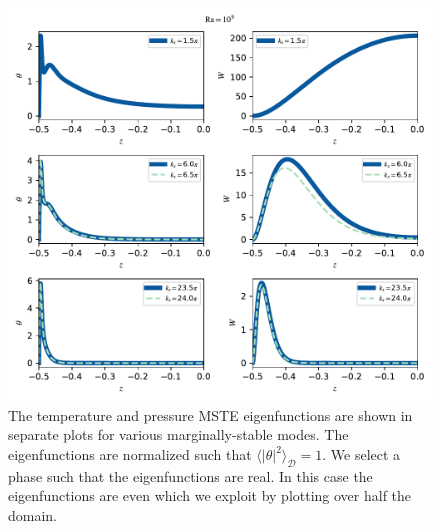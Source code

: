 \documentclass[reprint,amsmath,amssymb,aps,nofootinbib]{revtex4-1}
\begin{document}
\begin{figure}[H]
    \centering
    \includegraphics[width=6.75in]{grid_vars.pdf}
    \caption{The temperature and pressure MSTE eigenfunctions are shown in separate plots for various marginally-stable modes. 
    The eigenfunctions are normalized such that $\langle |\theta|^2\rangle_{\mathcal{D}}=1$.
    We select a phase such that the eigenfunctions are real.
    In this case the eigenfunctions are even which we exploit by plotting over half the domain.
    }%
    \label{fig:eigenfunctions}%
\end{figure}

\twocolumngrid
\clearpage
% 

\end{document}
